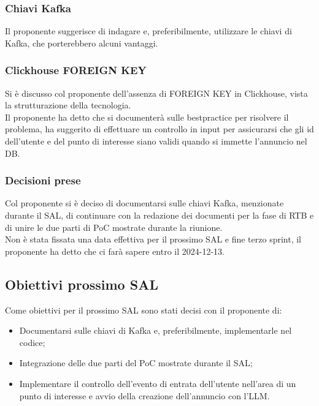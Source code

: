 \documentclass[12pt]{article}
\begin{document}
\subsubsection{Chiavi Kafka}
Il proponente suggerisce di indagare e, preferibilmente, utilizzare le chiavi di Kafka, che porterebbero alcuni vantaggi.

\subsubsection{Clickhouse FOREIGN KEY}
Si è discusso col proponente dell'assenza di FOREIGN KEY in Clickhouse, vista la strutturazione della tecnologia.\\
Il proponente ha detto che si documenterà sulle bestpractice per risolvere il problema, ha suggerito di effettuare un controllo in input per assicurarsi che gli id dell'utente e del punto di interesse siano validi quando si immette l'annuncio nel DB.

\subsubsection{Decisioni prese}
Col proponente si è deciso di documentarsi sulle chiavi Kafka, menzionate durante il SAL, di continuare con la redazione dei documenti per la fase di RTB e di unire le due parti di PoC mostrate durante la riunione.\\
Non è stata fissata una data effettiva per il prossimo SAL e fine terzo sprint, il proponente ha detto che ci farà sapere entro il 2024-12-13.
\newpage
\subsection{Obiettivi prossimo SAL}
Come obiettivi per il prossimo SAL sono stati decisi con il proponente di:
\begin{itemize}
\item Documentarsi sulle chiavi di Kafka e, preferibilmente, implementarle nel codice;
\item Integrazione delle due parti del PoC mostrate durante il SAL;
  \item Implementare il controllo dell'evento di entrata dell'utente nell'area di un punto di interesse e avvio della creazione dell'annuncio con l'LLM.
\end{itemize}
\end{document}
